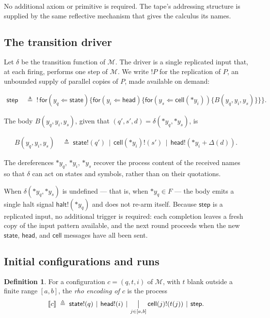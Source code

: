 \documentclass[11pt]{article}
\theoremstyle{plain}
\theoremstyle{definition}
\newtheorem{definition}[theorem]{Definition}
\theoremstyle{remark}
\newcommand{\drp}[1]{{\ast}#1}
\newcommand{\snd}[2]{#1!(#2)}
\newcommand{\rcv}[3]{\mathsf{for}(#1 \Leftarrow #2)\{#3\}}
\newcommand{\sembrack}[1]{\llbracket #1 \rrbracket}
\newcommand{\sn}{\mathbin{\mid}}    %
\newcommand{\bigsn}{\mathop{\textstyle\bigm|}}
\newcommand{\bang}{!}
\newcommand{\TM}{\mathcal{M}}
\newcommand{\Step}{\mathsf{step}}
\newcommand{\Cell}{\mathsf{cell}}
\newcommand{\Head}{\mathsf{head}}
\newcommand{\St}{\mathsf{state}}
\newcommand{\Halt}{\mathsf{halt}}
\begin{document}
\noindent No additional axiom or primitive is required. The tape's
addressing structure is supplied by the same reflective mechanism that
gives the calculus its names.

\subsection{The transition driver}

Let $\delta$ be the transition function of $\TM$. The driver is a single
replicated input that, at each firing, performs one step of $\TM$. We
write $\bang P$ for the replication of $P$, an unbounded supply of
parallel copies of $P$, made available on demand:

\begin{align*}
\Step &\;\triangleq\; \bang\,\rcv{y_q}{\St}{\rcv{y_i}{\Head}{\rcv{y_s}{\Cell(\drp{y_i})}{B(y_q, y_i, y_s)}}}.
\end{align*}

\noindent The body $B(y_q, y_i, y_s)$, given that
$(q', s', d) = \delta(\drp{y_q}, \drp{y_s})$, is

\begin{align*}
B(y_q, y_i, y_s) &\;\triangleq\;
\snd{\St}{q'} \,\sn\, \snd{\Cell(\drp{y_i})}{s'} \,\sn\, \snd{\Head}{\drp{y_i}+\Delta(d)}.
\end{align*}

\noindent The dereferences $\drp{y_q}$, $\drp{y_i}$, $\drp{y_s}$ recover the
process content of the received names so that $\delta$ can act on states
and symbols, rather than on their quotations.

When $\delta(\drp{y_q}, \drp{y_s})$ is undefined --- that is, when
$\drp{y_q} \in F$ --- the body emits a single halt signal
$\snd{\Halt}{\drp{y_q}}$ and does not re-arm itself. Because $\Step$ is a
replicated input, no additional trigger is required: each completion
leaves a fresh copy of the input pattern available, and the next round
proceeds when the new $\St$, $\Head$, and $\Cell$ messages have all been
sent.

\subsection{Initial configurations and runs}

\begin{definition}\label{def:enc}
For a configuration $c = (q, t, i)$ of $\TM$, with $t$ blank outside a
finite range $[a, b]$, the \emph{rho encoding of $c$} is the process
$$
\sembrack{c} \;\triangleq\;
\snd{\St}{q} \,\sn\, \snd{\Head}{i} \,\sn\, \bigsn_{j \in [a,b]} \snd{\Cell(j)}{t(j)}
\,\sn\, \Step.
$$
\end{definition}
\end{document}
